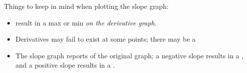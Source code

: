 \documentclass[notes]{subfiles}
\begin{document}
	Things to keep in mind when plotting the slope graph: 
		\begin{itemize}
			\item {} result in a max or min \emph{on the derivative graph}.
			\item Derivatives may fail to exist at some points; there may be a 
			\item The slope graph reports  of the original graph; a negative slope results  in a , and a positive slope results in a .
		\end{itemize}
			\newpage
			
\end{document}
